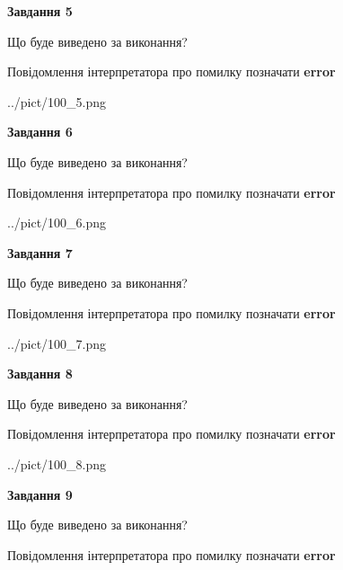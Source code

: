 \documentclass[11pt, ukrainian]{article}
\begin{document}
{\begin {large}
{\begin {center}\textbf{Завдання 5}\end {center}}\par
Що буде виведено за виконання? \par
Повідомлення інтерпретатора про помилку позначати \textbf{error}

\begin{center}
	{../pict/100_5.png}
\end{center}
\newpage

{\begin {center}\textbf{Завдання 6}\end {center}}\par
Що буде виведено за виконання? \par
Повідомлення інтерпретатора про помилку позначати \textbf{error}

\begin{center}
	{../pict/100_6.png}
\end{center}
\newpage

{\begin {center}\textbf{Завдання 7}\end {center}}\par
Що буде виведено за виконання? \par
Повідомлення інтерпретатора про помилку позначати \textbf{error}

\begin{center}
	{../pict/100_7.png}
\end{center}
\newpage

{\begin {center}\textbf{Завдання 8}\end {center}}\par
Що буде виведено за виконання? \par
Повідомлення інтерпретатора про помилку позначати \textbf{error}

\begin{center}
	{../pict/100_8.png}
\end{center}
\newpage

{\begin {center}\textbf{Завдання 9}\end {center}}\par
Що буде виведено за виконання? \par
Повідомлення інтерпретатора про помилку позначати \textbf{error}


\end{large}}
\end{document}
